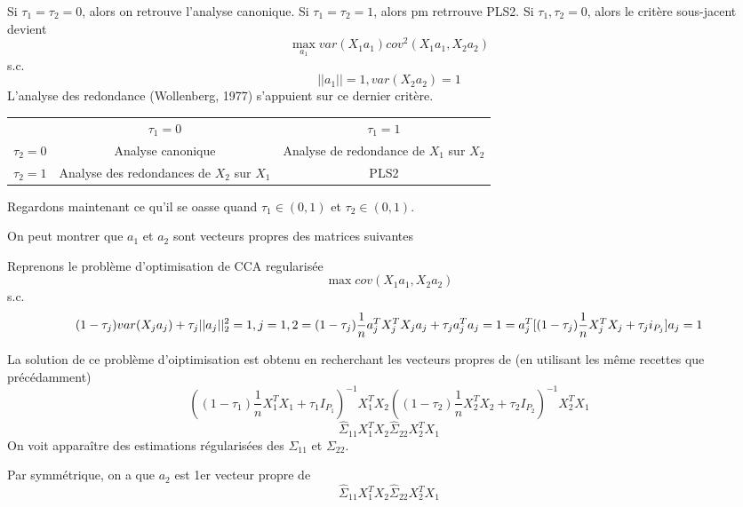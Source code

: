 \documentclass{article}
\begin{document}
Si $\tau_1=\tau_2=0$, alors on retrouve l'analyse canonique.
Si $\tau_1=\tau_2=1$, alors pm retrrouve PLS2.
Si $\tau_1, \tau_2=0$, alors le crit\`ere sous-jacent devient
\begin{equation}
\max_{a_1} var(X_1a_1)cov^2(X_1a_1, X_2a_2)
\end{equation}
s.c.
\begin{equation}
||a_1||=1, var(X_2a_2)=1
\end{equation}
L'analyse des redondance (Wollenberg, 1977) s'appuient sur ce dernier crit\`ere.

\begin{table}
\begin{tabular}{ccc}
 & $\tau_1=0$ & $\tau_1=1$ \\
 $\tau_2=0$ & Analyse canonique & Analyse de redondance de $X_1$ sur $X_2$ \\
 $\tau_2=1$ & Analyse des redondances de $X_2$ sur $X_1$ & PLS2
\end{tabular}
\end{table}

Regardons maintenant ce qu'il se oasse quand $\tau_1\in(0,1)$ et $\tau_2\in(0,1)$.

On peut montrer que $a_1$ et $a_2$ sont vecteurs propres des matrices suivantes

Reprenons le probl\`eme d'optimisation de CCA regularis\'ee
\begin{equation}
\max cov(X_1a_1, X_2a_2)
\end{equation}
s.c.
\begin{equation}
(1-\tau_j)var(X_ja_j)+\tau_j||a_j||^2_2=1, j=1,2\\
=(1-\tau_j)\frac{1}{n}a_j^TX_j^TX_ja_j+\tau_ja_j^Ta_j=1
=a_j^T[(1-\tau_j)\frac{1}{n}X_j^TX_j+\tau_j i_{P_j}]a_j=1
\end{equation}

La solution de ce probl\`eme d'oiptimisation est obtenu en recherchant les vecteurs propres de
(en utilisant les m\^eme recettes que pr\'ec\'edamment)
\begin{equation}
((1-\tau_1)\frac{1}{n}X_1^TX_1+\tau_1I_{P_1})^{-1}X_1^TX_2((1-\tau_2)\frac{1}{n}X_2^TX_2+\tau_2I_{P_2})^{-1}X_2^TX_1
\end{equation}
\begin{equation}
\hat{\Sigma}_{11}X_1^TX_2\hat{\Sigma}_{22}X_2^TX_1
\end{equation}
On voit appara\^itre des estimations r\'egularis\'ees des $\Sigma_{11}$ et $\Sigma_{22}$.

Par symm\'etrique, on a que $a_2$ est 1er vecteur propre de 
\begin{equation}
\hat{\Sigma}_{11}X_1^TX_2\hat{\Sigma}_{22}X_2^TX_1
\end{equation}
\end{document}
